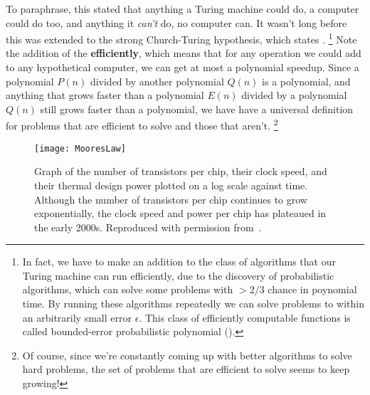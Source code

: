 To paraphrase, this stated that anything a Turing machine could do, a computer could do too, and anything
it \emph{can't} do, no computer can. It wasn't long before this was extended to the strong Church-Turing
hypothesis, which states .
\footnote{In fact, we have to make an addition to the class of algorithms that our Turing machine can run efficiently,
 due to the discovery of probabilistic algorithms, which can solve some problems with $> 2/3$ chance in
 poynomial time. By running these algorithms repeatedly we can solve problems to within an arbitrarily small 
 error $\epsilon$. This class of efficiently computable functions is called bounded-error probabilistic polynomial ().}
Note the addition of the \textbf{efficiently}, which means that for any
operation we could add to any hypothetical computer, we can get at most a polynomial speedup. Since
a polynomial $P(n)$ divided by another polynomial $Q(n)$ is a polynomial, and anything that grows faster
than a polynomial $E(n)$ divided by a polynomial $Q(n)$ still grows faster than a polynomial, we have
have a universal definition for problems that are efficient to solve and those that aren't.
\footnote{Of course, since we're constantly coming up with better algorithms to solve hard problems,
the set of problems that are efficient to solve seems to keep growing!}


\begin{figure}
  \texttt{[image: MooresLaw]}
  \caption[Moore's Law and the end of exponential scaling]
  {Graph of the number of transistors per chip, their clock speed, and their
  thermal design power plotted on a log scale against time. Although the number of transistors per chip
  continues to grow exponentially, the clock speed and power per chip has plateaued in the early 2000s.
  Reproduced with permission from~\cite{cross_2016}.}
  \label{fig:mooreslaw}
\end{figure}

